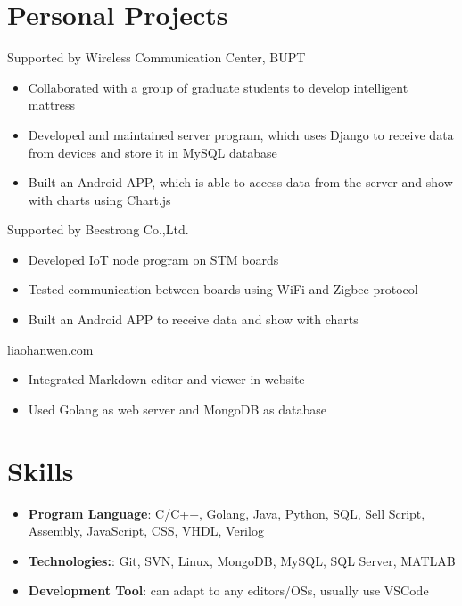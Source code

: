 \documentclass{resume}
\begin{document}
\section{Personal Projects}
Supported by Wireless Communication Center, BUPT
\begin{itemize}[parsep=0.25ex]
    \item Collaborated with a group of graduate students to develop intelligent mattress
    \item Developed and maintained server program, which uses Django to receive data from devices and store it in MySQL database
    \item Built an Android APP, which is able to access data from the server and show with charts using Chart.js
\end{itemize}
Supported by Becstrong Co.,Ltd.
\begin{itemize}[parsep=0.25ex]
    \item Developed IoT node program on STM boards
    \item Tested communication between boards using WiFi and Zigbee protocol
    \item Built an Android APP to receive data and show with charts
\end{itemize}
\href{https://liaohanwen.com}{liaohanwen.com}
\begin{itemize}[parsep=0.25ex]
    \item Integrated Markdown editor and viewer in website
    \item Used Golang as web server and MongoDB as database
\end{itemize}

\section{Skills}
\begin{itemize}[parsep=0.25ex]
    \item
          \textbf{Program Language}:
          C/C++, Golang, Java, Python, SQL, Sell Script, Assembly, JavaScript, CSS, VHDL, Verilog 
    \item
          \textbf{Technologies:}:
          Git, SVN, Linux, MongoDB, MySQL, SQL Server, MATLAB
    \item
          \textbf{Development Tool}:
          can adapt to any editors/OSs, usually use VSCode
\end{itemize}
\end{document}
